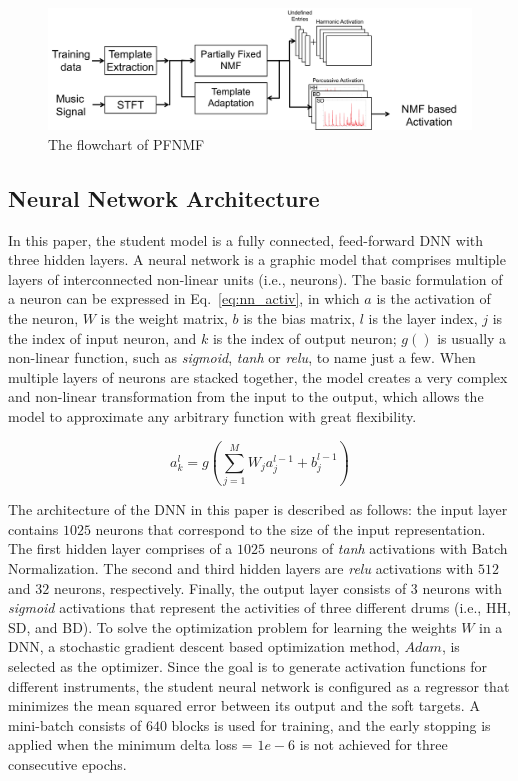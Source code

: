 \documentclass{article}
\begin{document}
\begin{figure}
\centering
\includegraphics[width = 8 cm]{./figs/nmf.png}
\caption{The flowchart of PFNMF \cite{Wu2015a}}
\label{fig:pfnmf}
\end{figure}

\subsection{Neural Network Architecture}\label{subsec:nn}
In this paper, the student model is a fully connected, feed-forward DNN with three hidden layers. A neural network is a graphic model that comprises multiple layers of interconnected non-linear units (i.e., neurons). The basic formulation of a neuron can be expressed in Eq.~\ref{eq:nn_activ}, in which $a$ is the activation of the neuron, $W$ is the weight matrix, $b$ is the bias matrix, $l$ is the layer index, $j$ is the index of input neuron, and $k$ is the index of output neuron; $g( )$ is usually a non-linear function, such as \textit{sigmoid}, \textit{tanh} or \textit{relu}, to name just a few. When multiple layers of neurons are stacked together, the model creates a very complex and non-linear transformation from the input to the output, which allows the model to approximate any arbitrary function with great flexibility. 

\begin{equation}\label{eq:nn_activ}
a_{k}^{l} = g( \sum_{j=1}^{M} W_{j} a_{j}^{l-1} + b_{j}^{l-1})
\end{equation}

The architecture of the DNN in this paper is described as follows: the input layer contains $1025$ neurons that correspond to the size of the input representation. The first hidden layer comprises of a $1025$ neurons of \textit{tanh} activations with Batch Normalization. The second and third hidden layers are \textit{relu} activations with $512$ and $32$ neurons, respectively. Finally, the output layer consists of 3 neurons with \textit{sigmoid} activations that represent the activities of three different drums (i.e., HH, SD, and BD). To solve the optimization problem for learning the weights $W$ in a DNN, a stochastic gradient descent based optimization method, $Adam$, is selected as the optimizer. Since the goal is to generate activation functions for different instruments, the student neural network is configured as a regressor that minimizes the mean squared error between its output and the soft targets. A mini-batch consists of $640$ blocks is used for training, and the early stopping is applied when the minimum delta loss = $1e-6$ is not achieved for three consecutive epochs.  
\end{document}
